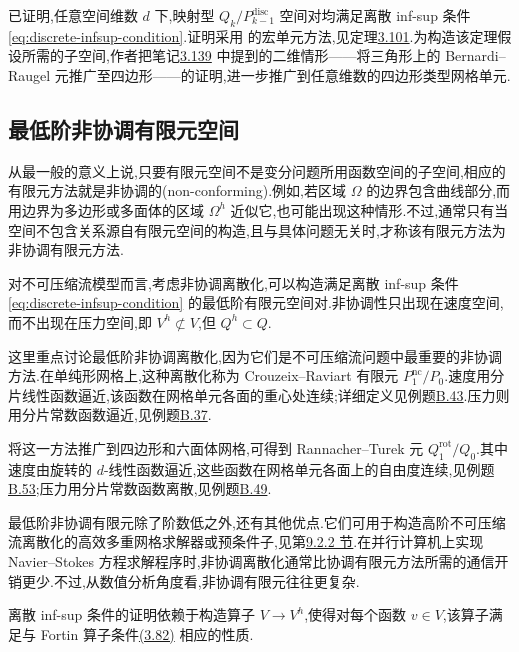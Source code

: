 \begin{note}\label{note:mapped-qk-pdisc}
\textcite{MatthiesTobiska2002} 已证明,任意空间维数 $d$ 下,映射型 $Q_k/P_{k-1}^{\mathrm{disc}}$ 空间对均满足离散 inf-sup 条件\cref{eq:discrete-infsup-condition}.证明采用\textcite{BolandNicolaides1983} 的宏单元方法,见定理\hyperref[thm:boland-nicolaides-macroelement-criterion]{3.101}.为构造该定理假设所需的子空间,作者把笔记\hyperref[note:bernardi-raugel-quadrilaterals]{3.139} 中提到的二维情形——将三角形上的 Bernardi--Raugel 元推广至四边形——的证明,进一步推广到任意维数的四边形类型网格单元.
\end{note}

\subsection{最低阶非协调有限元空间}\label{sec:lowest-order-nonconforming}

\begin{note}[非协调有限元空间]\label{note:nonconforming-finite-elements}
从最一般的意义上说,只要有限元空间不是变分问题所用函数空间的子空间,相应的有限元方法就是非协调的(non-conforming).例如,若区域 $\Omega$ 的边界包含曲线部分,而用边界为多边形或多面体的区域 $\Omega^h$ 近似它,也可能出现这种情形.不过,通常只有当空间不包含关系源自有限元空间的构造,且与具体问题无关时,才称该有限元方法为非协调有限元方法.

对不可压缩流模型而言,考虑非协调离散化,可以构造满足离散 inf-sup 条件\cref{eq:discrete-infsup-condition} 的最低阶有限元空间对.非协调性只出现在速度空间,而不出现在压力空间,即 $V^h\not\subset V$,但 $Q^h\subset Q$.

这里重点讨论最低阶非协调离散化,因为它们是不可压缩流问题中最重要的非协调方法.在单纯形网格上,这种离散化称为 Crouzeix--Raviart 有限元 $P_1^{\mathrm{nc}}/P_0$.速度用分片线性函数逼近,该函数在网格单元各面的重心处连续;详细定义见例题\hyperref[ex:appendix-b-43]{B.43}.压力则用分片常数函数逼近,见例题\hyperref[ex:appendix-b-37]{B.37}.

将这一方法推广到四边形和六面体网格,可得到 Rannacher--Turek 元 $Q_1^{\mathrm{rot}}/Q_0$.其中速度由旋转的 $d$-线性函数逼近,这些函数在网格单元各面上的自由度连续,见例题\hyperref[ex:appendix-b-53]{B.53};压力用分片常数函数离散,见例题\hyperref[ex:appendix-b-49]{B.49}.

最低阶非协调有限元除了阶数低之外,还有其他优点.它们可用于构造高阶不可压缩流离散化的高效多重网格求解器或预条件子,见第\hyperref[subsec:multigrid-method]{9.2.2 节}.在并行计算机上实现 Navier--Stokes 方程求解程序时,非协调离散化通常比协调有限元方法所需的通信开销更少.不过,从数值分析角度看,非协调有限元往往更复杂.

离散 inf-sup 条件的证明依赖于构造算子 $V\to V^h$,使得对每个函数 $v\in V$,该算子满足与 Fortin 算子条件\hyperref[eq:fortin-property]{(3.82)} 相应的性质.
\end{note}

